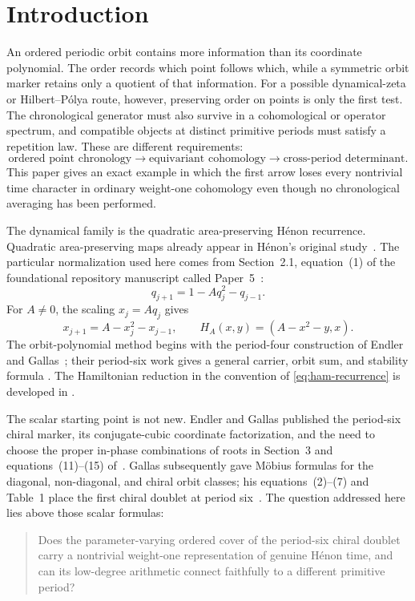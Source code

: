 \section{Introduction}

An ordered periodic orbit contains more information than its coordinate
polynomial.  The order records which point follows which, while a symmetric
orbit marker retains only a quotient of that information.  For a possible
dynamical-zeta or Hilbert--P\'olya route, however, preserving order on points
is only the first test.  The chronological generator must also survive in a
cohomological or operator spectrum, and compatible objects at distinct
primitive periods must satisfy a repetition law.  These are different
requirements:
\begin{equation}\label{eq:three-layers}
 \text{ordered point chronology}
 \longrightarrow \text{equivariant cohomology}
 \longrightarrow \text{cross-period determinant}.
\end{equation}
This paper gives an exact example in which the first arrow loses every
nontrivial time character in ordinary weight-one cohomology even though no
chronological averaging has been performed.

The dynamical family is the quadratic area-preserving H\'enon recurrence.
Quadratic area-preserving maps already appear in H\'enon's original
study~\cite{henon1969}.  The particular normalization used here comes from
Section~2.1, equation~(1) of the foundational repository manuscript called
Paper~5~\cite[Sec.~2.1, Eq.~(1)]{wang2026henon}:
\begin{equation}\label{eq:paper5-recurrence}
 q_{j+1}=1-Aq_j^2-q_{j-1}.
\end{equation}
For $A\ne0$, the scaling $x_j=Aq_j$ gives
\begin{equation}\label{eq:ham-recurrence}
 x_{j+1}=A-x_j^2-x_{j-1},
 \qquad
 H_A(x,y)=(A-x^2-y,x).
\end{equation}
The orbit-polynomial method begins with the period-four construction of
Endler and Gallas~\cite[Sec.~II, Eqs.~(1)--(6)]{endlergallas2002}; their
period-six work gives a general carrier, orbit sum, and stability formula
\cite[Eqs.~(1)--(3) and Appendix]{endlergallas2004}.  The Hamiltonian
reduction in the convention of \eqref{eq:ham-recurrence} is developed in
\cite[Eq.~(1) and Sec.~2]{endlergallas2006sums}.

The scalar starting point is not new.  Endler and Gallas published the
period-six chiral marker, its conjugate-cubic coordinate factorization, and
the need to choose the proper in-phase combinations of roots
in Section~3 and equations~(11)--(15) of~\cite{endlergallas2006chiral}.
Gallas subsequently gave M\"obius formulas for the diagonal,
non-diagonal, and chiral orbit classes; his equations~(2)--(7) and Table~1
place the first chiral doublet at period six~\cite{gallas2007}.  The question
addressed here lies above those scalar formulas:
\begin{quote}
Does the parameter-varying ordered cover of the period-six chiral doublet
carry a nontrivial weight-one representation of genuine H\'enon time, and
can its low-degree arithmetic connect faithfully to a different primitive
period?
\end{quote}

